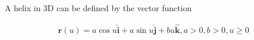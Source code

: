 A helix in 3D can be defined by the vector function

\begin{align*}
    \boldsymbol{r}(u) = a \cos u \hat{\boldsymbol{i}} + a \sin u \hat{\boldsymbol{j}} + bu \hat{\boldsymbol{k}}, a > 0, b > 0, u \geq 0
\end{align*}